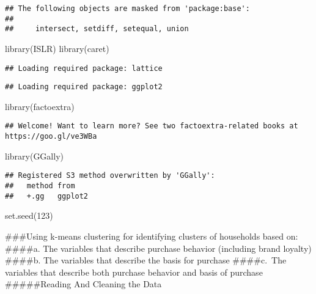 \documentclass[
]{article}
\newenvironment{Shaded}{\begin{snugshade}}{\end{snugshade}}
\newcommand{\DecValTok}[1]{\textcolor[rgb]{0.00,0.00,0.81}{#1}}
\newcommand{\FunctionTok}[1]{\textcolor[rgb]{0.00,0.00,0.00}{#1}}
\newcommand{\NormalTok}[1]{#1}
\begin{document}
\begin{verbatim}
## The following objects are masked from 'package:base':
## 
##     intersect, setdiff, setequal, union
\end{verbatim}

\begin{Shaded}
\begin{Highlighting}[]
\FunctionTok{library}\NormalTok{(ISLR)}
\FunctionTok{library}\NormalTok{(caret)}
\end{Highlighting}
\end{Shaded}

\begin{verbatim}
## Loading required package: lattice
\end{verbatim}

\begin{verbatim}
## Loading required package: ggplot2
\end{verbatim}

\begin{Shaded}
\begin{Highlighting}[]
\FunctionTok{library}\NormalTok{(factoextra)}
\end{Highlighting}
\end{Shaded}

\begin{verbatim}
## Welcome! Want to learn more? See two factoextra-related books at https://goo.gl/ve3WBa
\end{verbatim}

\begin{Shaded}
\begin{Highlighting}[]
\FunctionTok{library}\NormalTok{(GGally)}
\end{Highlighting}
\end{Shaded}

\begin{verbatim}
## Registered S3 method overwritten by 'GGally':
##   method from   
##   +.gg   ggplot2
\end{verbatim}

\begin{Shaded}
\begin{Highlighting}[]
\FunctionTok{set.seed}\NormalTok{(}\DecValTok{123}\NormalTok{)}
\end{Highlighting}
\end{Shaded}

\#\#\#Using k-means clustering for identifying clusters of households
based on: \#\#\#\#a. The variables that describe purchase behavior
(including brand loyalty) \#\#\#\#b. The variables that describe the
basis for purchase \#\#\#\#c.~The variables that describe both purchase
behavior and basis of purchase \#\#\#\#\#Reading And Cleaning the Data
\end{document}
